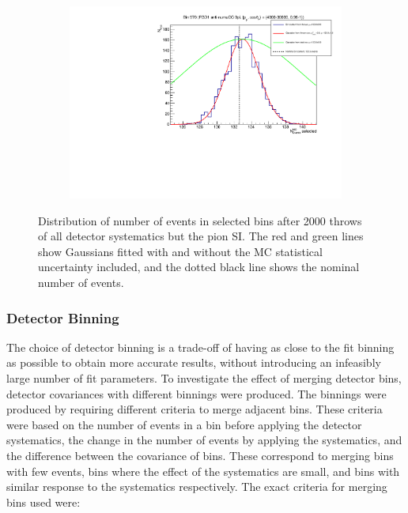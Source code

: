 \begin{figure}[h]
\begin{subfigure}{.49\textwidth}
\end{subfigure}
\begin{subfigure}{.49\textwidth}
  \centering
  \includegraphics[width=0.95\linewidth]{figs/detbin_nopisi570}
\end{subfigure}
\caption{Distribution of number of events in selected bins after 2000 throws of all detector systematics but the pion SI. The red and green lines show Gaussians fitted with and without the MC statistical uncertainty included, and the dotted black line shows the nominal number of events.}
\label{fig:detnopisibins}
\end{figure}

\subsubsection{Detector Binning}\label{sec:detbin}

The choice of detector binning is a trade-off of having as close to the fit binning as possible to obtain more accurate results, without introducing an infeasibly large number of fit parameters. To investigate the effect of merging detector bins, detector covariances with different binnings were produced. The binnings were produced by requiring different criteria to merge adjacent bins. These criteria were based on the number of events in a bin before applying the detector systematics, the change in the number of events by applying the systematics, and the difference between the covariance of bins. These correspond to merging bins with few events, bins where the effect of the systematics are small, and bins with similar response to the systematics respectively. The exact criteria for merging bins used were:

